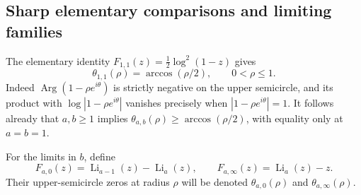 \documentclass[11pt]{article}
\numberwithin{equation}{section}
\theoremstyle{plain}
\theoremstyle{definition}
\theoremstyle{remark}
\begin{document}
\subsection{Sharp elementary comparisons and limiting families}

The elementary identity $F_{1,1}(z)=\tfrac12\log^2(1-z)$ gives
\begin{equation}\label{an:eq:elementaryradial}
 \theta_{1,1}(\rho)=\arccos(\rho/2),\qquad 0<\rho\le1.
\end{equation}
Indeed $\operatorname{Arg}(1-\rho e^{i\theta})$ is strictly negative
on the upper semicircle, and its product with
$\log|1-\rho e^{i\theta}|$ vanishes precisely when
$|1-\rho e^{i\theta}|=1$.
It follows already that $a,b\ge1$ implies
$\theta_{a,b}(\rho)\ge\arccos(\rho/2)$, with equality only at
$a=b=1$.

For the limits in $b$, define
\[
 F_{a,0}(z)=\operatorname{Li}_{a-1}(z)-\operatorname{Li}_a(z),
 \qquad
 F_{a,\infty}(z)=\operatorname{Li}_a(z)-z.
\]
Their upper-semicircle zeros at radius $\rho$ will be denoted
$\theta_{a,0}(\rho)$ and $\theta_{a,\infty}(\rho)$.
\end{document}
